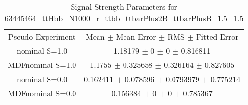 \begin{table}
\centering
\caption{Signal Strength Parameters for 63445464\_ttHbb\_N1000\_r\_ttbb\_ttbarPlus2B\_ttbarPlusB\_1.5\_1.5}
\begin{tabular}{cc}
\toprule
Pseudo Experiment & Mean $\pm$ Mean Error $\pm$ RMS $\pm$ Fitted Error\\
nominal S=1.0 & \num{1.18179} $\pm$ \num{0} $\pm$ \num{0} $\pm$ \num{0.816811}\\
MDFnominal S=1.0 & \num{1.1755} $\pm$ \num{0.325658} $\pm$ \num{0.326164} $\pm$ \num{0.827605}\\
nominal S=0.0 & \num{0.162411} $\pm$ \num{0.078596} $\pm$ \num{0.0793979} $\pm$ \num{0.775214}\\
MDFnominal S=0.0 & \num{0.156384} $\pm$ \num{0} $\pm$ \num{0} $\pm$ \num{0.785367}\\
\bottomrule
\end{tabular}
\end{table}